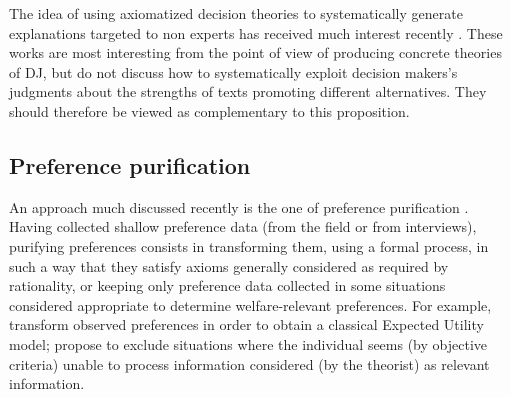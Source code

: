 \documentclass[version=last, pagesize, twoside=off, bibliography=totoc, DIV=calc, fontsize=12pt, a4paper, french, english]{scrartcl}
\begin{document}
The idea of using axiomatized decision theories to systematically generate explanations targeted to non experts has received much interest recently \citep{labreuche_general_2011, belahcene_explaining_2017, belahcene_accountable_2018, belahcene_comparing_2019, cailloux_arguing_2016, boixel_automated_2020, peters_explainable_2020, procaccia_axioms_2019}. These works are most interesting from the point of view of producing concrete theories of \ac{DJ}, but do not discuss how to systematically exploit decision makers’s judgments about the strengths of texts promoting different alternatives. They should therefore be viewed as complementary to this proposition.

\subsection{Preference purification}
\label{sec:purification}
An approach much discussed recently is the one of preference purification \citep{bernheim_beyond_2009, rubinstein_eliciting_2011, infante_preference_2016}.
Having collected shallow preference data (from the field or from interviews), purifying preferences consists in transforming them, using a formal process, in such a way that they satisfy axioms generally considered as required by rationality, or keeping only preference data collected in some situations considered appropriate to determine welfare-relevant preferences. 
For example, \citet{bleichrodt_making_2001} transform observed preferences in order to obtain a classical Expected Utility model; \citet[Section VII]{bernheim_beyond_2009} propose to exclude situations where the individual seems (by objective criteria) unable to process information considered (by the theorist) as relevant information.%
\end{document}

